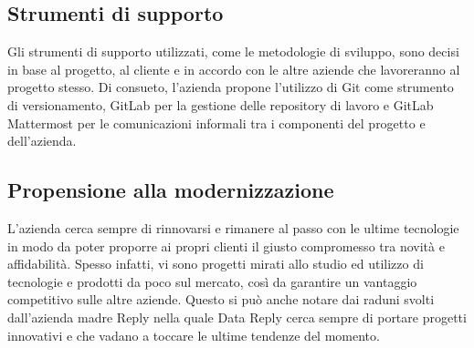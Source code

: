\subsection{Strumenti di supporto}
Gli strumenti di supporto utilizzati, come le metodologie di sviluppo,  sono decisi in base al progetto, al cliente e in accordo con le altre aziende che lavoreranno al progetto stesso.
Di consueto, l'azienda propone l'utilizzo di \gls{Git} come strumento di versionamento, \gls{GitLab} per la gestione delle repository di lavoro e \gls{GitLab Mattermost} per le comunicazioni informali tra i componenti del progetto e dell'azienda.
\subsection{Propensione alla modernizzazione}
L'azienda cerca sempre di rinnovarsi e rimanere al passo con le ultime tecnologie in modo da poter proporre ai propri clienti il giusto compromesso tra novità e affidabilità. Spesso infatti, vi sono progetti mirati allo studio ed utilizzo di tecnologie e prodotti da poco sul mercato, così da garantire un vantaggio competitivo sulle altre aziende.
Questo si può anche notare dai raduni svolti dall'azienda madre Reply nella quale Data Reply cerca sempre di portare progetti innovativi e che vadano a toccare le ultime tendenze del momento.
